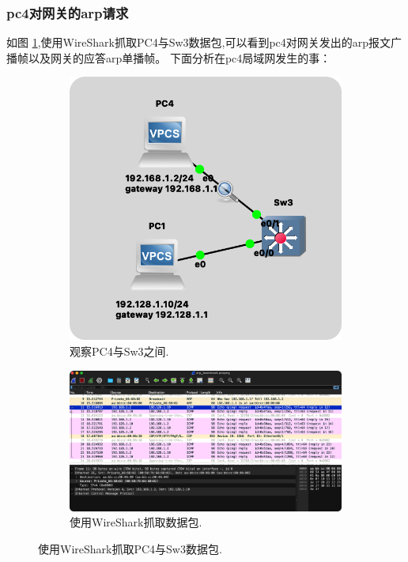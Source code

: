 \documentclass[a4paper,12pt]{report}
\begin{document}
\begin{spacing}{1.5}
\subsubsection{pc4对网关的arp请求}
如图 \ref{fig:168},使用WireShark抓取PC4与Sw3数据包,可以看到pc4对网关发出的arp报文广播帧以及网关的应答arp单播帧。
下面分析在pc4局域网发生的事：
\begin{figure}[h!]
  \centering
  \begin{subfigure}[b]{0.3\linewidth}
    \includegraphics[width=\linewidth]{figure/128.png}
    \caption{观察PC4与Sw3之间.}
  \end{subfigure}
  \begin{subfigure}[b]{0.6\linewidth}
    \includegraphics[width=\linewidth]{figure/168gateway.png}
    \caption{使用WireShark抓取数据包.}
  \end{subfigure}
  \caption{使用WireShark抓取PC4与Sw3数据包.}
  \label{fig:168}
\end{figure}


\end{spacing}
\end{document}
